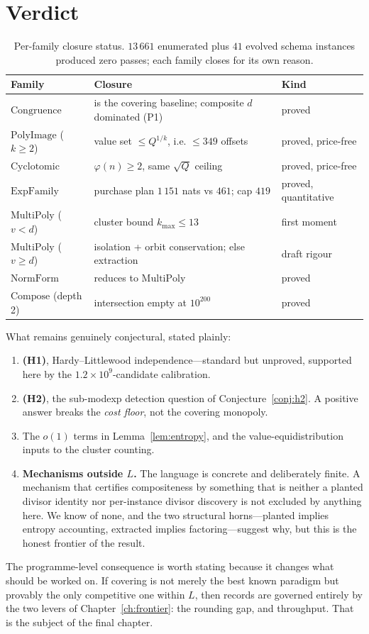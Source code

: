 \section{Verdict}

\begin{table}[h]
\centering\small
\caption{Per-family closure status. $13\,661$ enumerated plus $41$ evolved
schema instances produced zero passes; each family closes for its own
reason.}\label{tab:closure}
\begin{tabular}{lll}
\toprule
Family & Closure & Kind\\
\midrule
$\mathrm{Congruence}$ & is the covering baseline; composite $d$ dominated (P1) & proved\\
$\mathrm{PolyImage}$ ($k\ge2$) & value set $\le Q^{1/k}$, i.e. $\le349$ offsets & proved, price-free\\
$\mathrm{Cyclotomic}$ & $\varphi(n)\ge2$, same $\sqrt Q$ ceiling & proved, price-free\\
$\mathrm{ExpFamily}$ & purchase plan $1\,151$ nats vs $461$; cap $419$ & proved, quantitative\\
$\mathrm{MultiPoly}$ ($v<d$) & cluster bound $k_{\max}\le13$ & first moment\\
$\mathrm{MultiPoly}$ ($v\ge d$) & isolation + orbit conservation; else extraction & draft rigour\\
$\mathrm{NormForm}$ & reduces to $\mathrm{MultiPoly}$ & proved\\
$\mathrm{Compose}$ (depth 2) & intersection empty at $10^{200}$ & proved\\
\bottomrule
\end{tabular}
\end{table}

What remains genuinely conjectural, stated plainly:
\begin{enumerate}
\item \textbf{(H1)}, Hardy--Littlewood independence---standard but unproved,
supported here by the $1.2\times10^{9}$-candidate calibration.
\item \textbf{(H2)}, the sub-modexp detection question of
Conjecture~\ref{conj:h2}. A positive answer breaks the \emph{cost floor}, not
the covering monopoly.
\item The $o(1)$ terms in Lemma~\ref{lem:entropy}, and the
value-equidistribution inputs to the cluster counting.
\item \textbf{Mechanisms outside $L$.} The language is concrete and deliberately
finite. A mechanism that certifies compositeness by something that is neither a
planted divisor identity nor per-instance divisor discovery is not excluded by
anything here. We know of none, and the two structural horns---planted implies
entropy accounting, extracted implies factoring---suggest why, but this is the
honest frontier of the result.
\end{enumerate}

The programme-level consequence is worth stating because it changes what should
be worked on. If covering is not merely the best known paradigm but provably the
only competitive one within $L$, then records are governed entirely by the two
levers of Chapter~\ref{ch:frontier}: the rounding gap, and throughput. That is
the subject of the final chapter.
